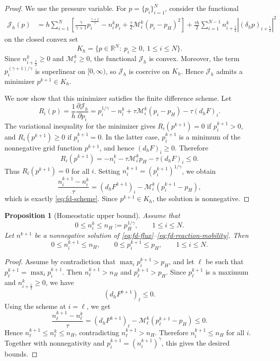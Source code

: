 \documentclass[11pt]{article}
\theoremstyle{plain}
\numberwithin{equation}{section}
\newtheorem{proposition}{Proposition}[section]
\begin{document}
\begin{proof}
We use the pressure variable. For \(p=\{p_i\}_{i=1}^N\), consider the functional
\[
\begin{aligned}
\mathcal J_h(p)
&=
h\sum_{i=1}^N
\left[
\frac{\gamma}{\gamma+1}p_i^{\frac{\gamma+1}{\gamma}}
-
n_i^k p_i
+
\frac{\tau}{2}\mathcal M_i^k(p_i-p_H)^2
\right]  
+
\frac{\tau h}{2}
\sum_{i=1}^{N-1}
n_{i+\frac12}^k
\left|(\delta_h p)_{i+\frac12}\right|^2
\end{aligned}
\]
on the closed convex set
\[
    K_h=\{p\in\mathbb R^N:\ p_i\ge0,\ 1\le i\le N\}.
\]
Since \(n_{i+\frac12}^k\ge0\) and \(\mathcal M_i^k\ge0\), the functional
\(\mathcal J_h\) is convex. Moreover, the term
\(p_i^{(\gamma+1)/\gamma}\) is superlinear on \([0,\infty)\), so
\(\mathcal J_h\) is coercive on \(K_h\). Hence \(\mathcal J_h\) admits a
minimizer \(p^{k+1}\in K_h\).

We now show that this minimizer satisfies the finite difference scheme. Let
\[
R_i(p) = \frac{1}{h}\frac{\partial \mathcal J_h}{\partial p_i}
=
p_i^{1/\gamma}
-
n_i^k
+
\tau\mathcal M_i^k(p_i-p_H)
-
\tau(d_hF)_i .
\]
The variational inequality for the minimizer gives
\(R_i(p^{k+1})=0\) if \(p_i^{k+1}>0\), and
\(R_i(p^{k+1})\ge0\) if \(p_i^{k+1}=0\). In the latter case,
\(p_i^{k+1}\) is a minimum of the nonnegative grid function \(p^{k+1}\),
and hence \((d_hF)_i\ge0\). Therefore
\[
    R_i(p^{k+1})
    =
    -n_i^k-\tau\mathcal M_i^k p_H-\tau(d_hF)_i
    \le0 .
\]
Thus \(R_i(p^{k+1})=0\) for all \(i\). Setting
\(n_i^{k+1}=(p_i^{k+1})^{1/\gamma}\), we obtain
\[
    \frac{n_i^{k+1}-n_i^k}{\tau}
    =
    (d_hF^{k+1})_i
    -
    \mathcal M_i^k(p_i^{k+1}-p_H),
\]
which is exactly \eqref{eq:fd-scheme}. Since \(p^{k+1}\in K_h\), the
solution is nonnegative.
\end{proof}


\begin{proposition}[Homeostatic upper bound]
\label{prop:fd-upper-bound}
Assume that
\[
    0\le n_i^k\le n_H:=p_H^{1/\gamma},
    \qquad 1\le i\le N .
\]
Let \(n^{k+1}\) be a nonnegative solution of
\eqref{eq:fd-flux}--\eqref{eq:fd-reaction-mobility}. Then
\[
    0\le n_i^{k+1}\le n_H,
    \qquad
    0\le p_i^{k+1}\le p_H,
    \qquad 1\le i\le N .
\]
\end{proposition}

\begin{proof}
Assume by contradiction that \(\max_i p_i^{k+1}>p_H\), and let \(\ell\)
be such that \(p_\ell^{k+1}=\max_i p_i^{k+1}\). Then
\(n_\ell^{k+1}>n_H\) and \(p_\ell^{k+1}>p_H\). Since \(p_\ell^{k+1}\) is a maximum and
\(n_{i+\frac12}^k\ge0\), we have
\[
    (d_hF^{k+1})_\ell\le0 .
\]
Using the scheme at \(i=\ell\), we get
\[
    \frac{n_\ell^{k+1}-n_\ell^k}{\tau}
    =
    (d_hF^{k+1})_\ell
    -
    \mathcal M_\ell^k(p_\ell^{k+1}-p_H)
    \le0 .
\]
Hence \(n_\ell^{k+1}\le n_\ell^k\le n_H\), contradicting
\(n_\ell^{k+1}>n_H\). Therefore \(n_i^{k+1}\le n_H\) for all \(i\).
Together with nonnegativity and \(p_i^{k+1}=(n_i^{k+1})^\gamma\), this gives
the desired bounds.
\end{proof}
\end{document}
